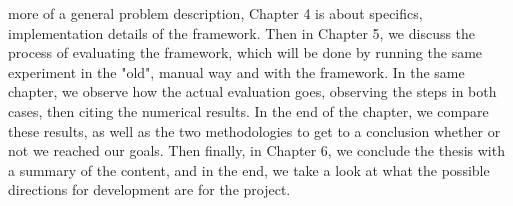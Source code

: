 more of a general problem description, Chapter 4 is about specifics,
implementation details of the framework. Then in Chapter 5, we
discuss the process of evaluating the framework, which will be done by
running the same experiment in the "old", manual way and with the
framework. In the same chapter, we observe how the actual evaluation
goes, observing the steps in both cases, then citing the numerical
results. In the end of the chapter, we compare these results, as well
as the two methodologies to get to a conclusion whether or not we
reached our goals. Then finally, in Chapter 6, we conclude the thesis
with a summary of the content, and in the end, we take a look at what
the possible directions for development are for the project.
